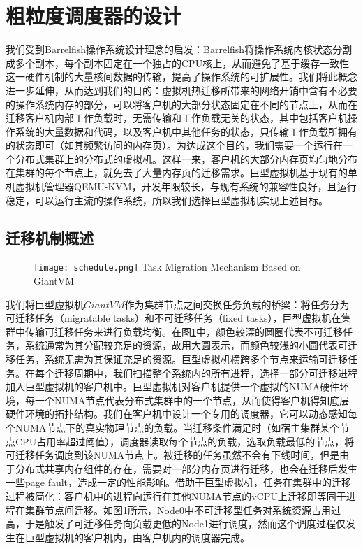 \section{粗粒度调度器的设计}
我们受到Barrelfish操作系统设计理念的启发：Barrelfish将操作系统内核状态分割成多个副本，每个副本固定在一个独占的CPU核上，从而避免了基于缓存一致性这一硬件机制的大量核间数据的传输，提高了操作系统的可扩展性。我们将此概念进一步延伸，从而达到我们的目的：虚拟机热迁移所带来的网络开销中含有不必要的操作系统内存的部分，可以将客户机的大部分状态固定在不同的节点上，从而在迁移客户机内部工作负载时，无需传输和工作负载无关的状态，其中包括客户机操作系统的大量数据和代码，以及客户机中其他任务的状态，只传输工作负载所拥有的状态即可（如其频繁访问的内存页）。为达成这个目的，我们需要一个运行在一个分布式集群上的分布式的虚拟机。这样一来，客户机的大部分内存页均匀地分布在集群的每个节点上，就免去了大量内存页的迁移需求。巨型虚拟机基于现有的单机虚拟机管理器QEMU-KVM，开发年限较长，与现有系统的兼容性良好，且运行稳定，可以运行主流的操作系统，所以我们选择巨型虚拟机实现上述目标。

\subsection{迁移机制概述}
\begin{figure}[!htp]
  \centering
  \texttt{[image: schedule.png]}
    {Task Migration Mechanism Based on GiantVM}
  \label{fig:schedule}
\end{figure}

我们将巨型虚拟机$GiantVM$作为集群节点之间交换任务负载的桥梁：将任务分为可迁移任务（migratable tasks）和不可迁移任务（fixed tasks），巨型虚拟机在集群中传输可迁移任务来进行负载均衡。在图\ref{fig:schedule}中，颜色较深的圆圈代表不可迁移任务，系统通常为其分配较充足的资源，故用大圆表示，而颜色较浅的小圆代表可迁移任务，系统无需为其保证充足的资源。巨型虚拟机横跨多个节点来运输可迁移任务。在每个迁移周期中，我们扫描整个系统内的所有进程，选择一部分可迁移进程加入巨型虚拟机的客户机中。巨型虚拟机对客户机提供一个虚拟的NUMA硬件环境，每一个NUMA节点代表分布式集群中的一个节点，从而使得客户机得知底层硬件环境的拓扑结构。我们在客户机中设计一个专用的调度器，它可以动态感知每个NUMA节点下的真实物理节点的负载。当迁移条件满足时（如宿主集群某个节点CPU占用率超过阈值），调度器读取每个节点的负载，选取负载最低的节点，将可迁移任务调度到该NUMA节点上。被迁移的任务虽然不会有下线时间，但是由于分布式共享内存组件的存在，需要对一部分内存页进行迁移，也会在迁移后发生一些page fault，造成一定的性能影响。借助于巨型虚拟机，任务在集群中的迁移过程被简化：客户机中的进程向运行在其他NUMA节点的vCPU上迁移即等同于进程在集群节点间迁移。如图\ref{fig:schedule}所示，Node0中不可迁移型任务对系统资源占用过高，于是触发了可迁移任务向负载更低的Node1进行调度，然而这个调度过程仅发生在巨型虚拟机的客户机内，由客户机内的调度器完成。

